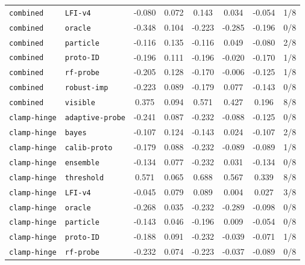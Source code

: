\documentclass{article}
\begin{document}
\begin{center}
{\begin{tabular}{llcccccc}
\texttt{combined} & \texttt{LFI-v4} & -0.080 & 0.072 & 0.143 & 0.034 & -0.054 & 1/8 \\
\texttt{combined} & \texttt{oracle} & -0.348 & 0.104 & -0.223 & -0.285 & -0.196 & 0/8 \\
\texttt{combined} & \texttt{particle} & -0.116 & 0.135 & -0.116 & 0.049 & -0.080 & 2/8 \\
\texttt{combined} & \texttt{proto-ID} & -0.196 & 0.111 & -0.196 & -0.020 & -0.170 & 1/8 \\
\texttt{combined} & \texttt{rf-probe} & -0.205 & 0.128 & -0.170 & -0.006 & -0.125 & 1/8 \\
\texttt{combined} & \texttt{robust-imp} & -0.223 & 0.089 & -0.179 & 0.077 & -0.143 & 0/8 \\
\texttt{combined} & \texttt{visible} & 0.375 & 0.094 & 0.571 & 0.427 & 0.196 & 8/8 \\
\texttt{clamp-hinge} & \texttt{adaptive-probe} & -0.241 & 0.087 & -0.232 & -0.088 & -0.125 & 0/8 \\
\texttt{clamp-hinge} & \texttt{bayes} & -0.107 & 0.124 & -0.143 & 0.024 & -0.107 & 2/8 \\
\texttt{clamp-hinge} & \texttt{calib-proto} & -0.179 & 0.088 & -0.232 & -0.089 & -0.089 & 1/8 \\
\texttt{clamp-hinge} & \texttt{ensemble} & -0.134 & 0.077 & -0.232 & 0.031 & -0.134 & 0/8 \\
\texttt{clamp-hinge} & \texttt{threshold} & 0.571 & 0.065 & 0.688 & 0.567 & 0.339 & 8/8 \\
\texttt{clamp-hinge} & \texttt{LFI-v4} & -0.045 & 0.079 & 0.089 & 0.004 & 0.027 & 3/8 \\
\texttt{clamp-hinge} & \texttt{oracle} & -0.268 & 0.035 & -0.232 & -0.289 & -0.098 & 0/8 \\
\texttt{clamp-hinge} & \texttt{particle} & -0.143 & 0.046 & -0.196 & 0.009 & -0.054 & 0/8 \\
\texttt{clamp-hinge} & \texttt{proto-ID} & -0.188 & 0.091 & -0.232 & -0.039 & -0.071 & 1/8 \\
\texttt{clamp-hinge} & \texttt{rf-probe} & -0.232 & 0.074 & -0.223 & -0.037 & -0.089 & 0/8 \\
\bottomrule
\end{tabular}%
}
\end{center}
\end{document}

